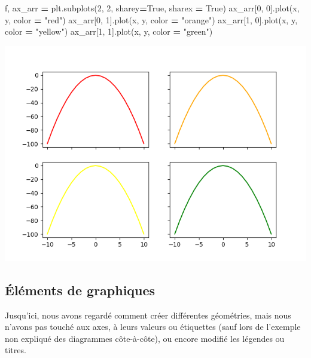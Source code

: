 \documentclass[
  12pt,
]{book}
\newenvironment{Shaded}{\begin{snugshade}}{\end{snugshade}}
\newcommand{\DecValTok}[1]{\textcolor[rgb]{0.00,0.00,0.81}{#1}}
\newcommand{\NormalTok}[1]{#1}
\newcommand{\OperatorTok}[1]{\textcolor[rgb]{0.81,0.36,0.00}{\textbf{#1}}}
\newcommand{\StringTok}[1]{\textcolor[rgb]{0.31,0.60,0.02}{#1}}
\newcommand{\VariableTok}[1]{\textcolor[rgb]{0.00,0.00,0.00}{#1}}
\numberwithin{equation}{section}
\numberwithin{countremarque}{section}
\begin{document}
\begin{Shaded}
\begin{Highlighting}[]
\NormalTok{f, ax\_arr }\OperatorTok{=}\NormalTok{ plt.subplots(}\DecValTok{2}\NormalTok{, }\DecValTok{2}\NormalTok{, sharey}\OperatorTok{=}\VariableTok{True}\NormalTok{, sharex }\OperatorTok{=} \VariableTok{True}\NormalTok{)}
\NormalTok{ax\_arr[}\DecValTok{0}\NormalTok{, }\DecValTok{0}\NormalTok{].plot(x, y, color }\OperatorTok{=} \StringTok{"red"}\NormalTok{)}
\NormalTok{ax\_arr[}\DecValTok{0}\NormalTok{, }\DecValTok{1}\NormalTok{].plot(x, y, color }\OperatorTok{=} \StringTok{"orange"}\NormalTok{)}
\NormalTok{ax\_arr[}\DecValTok{1}\NormalTok{, }\DecValTok{0}\NormalTok{].plot(x, y, color }\OperatorTok{=} \StringTok{"yellow"}\NormalTok{)}
\NormalTok{ax\_arr[}\DecValTok{1}\NormalTok{, }\DecValTok{1}\NormalTok{].plot(x, y, color }\OperatorTok{=} \StringTok{"green"}\NormalTok{)}
\end{Highlighting}
\end{Shaded}

\begin{center}\includegraphics[width=9.03in]{figs/pyplot/subplots_share} \end{center}

\subsection{Éléments de graphiques}\label{pyplot-elements-graphiques}

Jusqu'ici, nous avons regardé comment créer différentes géométries, mais nous n'avons pas touché aux axes, à leurs valeurs ou étiquettes (sauf lors de l'exemple non expliqué des diagrammes côte-à-côte), ou encore modifié les légendes ou titres.
\end{document}
